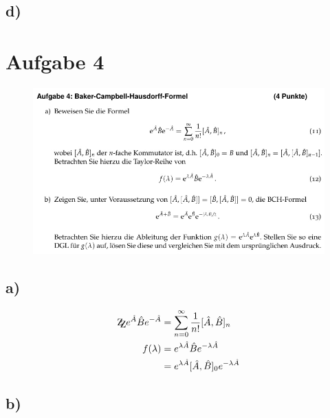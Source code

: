     \subsection{d)}


\section{Aufgabe 4}

    \begin{figure}[H]
        \centering
        \includegraphics[width=\textwidth]{images/Aufgabe4.jpg}
        \label{fig:5}
    \end{figure}

    \subsection{a)}
    \begin{align}
    \mathrm{Z\kern-.3em\raise-0.5ex\hbox{Z}} e^{\hat A} \hat B e^{-\hat A} &= \sum_{n=0}^{\infty} \frac{1}{n!} [\hat A , \hat B]_n\\
    f(\lambda) &= e^{\lambda \hat A} \hat B e^{- \lambda \hat A}\\
    &= e^{\lambda \hat A} [\hat A , \hat B]_0 e^{-\lambda \hat A}
    \end{align}
    \subsection{b)}



